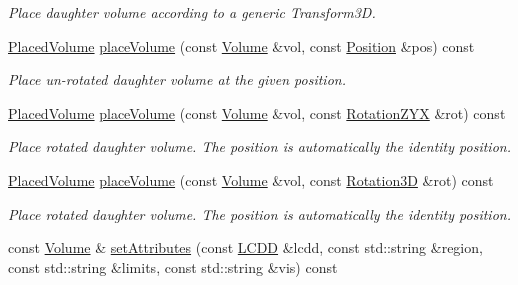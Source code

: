 \begin{DoxyCompactItemize}
\begin{DoxyCompactList}\small\item\em Place daughter volume according to a generic Transform3D. \item\end{DoxyCompactList}\item 
\hyperlink{class_d_d4hep_1_1_geometry_1_1_placed_volume}{PlacedVolume} \hyperlink{class_d_d4hep_1_1_geometry_1_1_volume_aeee43002378b1a0332d6b0ccdf4969b9}{placeVolume} (const \hyperlink{class_d_d4hep_1_1_geometry_1_1_volume}{Volume} \&vol, const \hyperlink{namespace_d_d4hep_1_1_geometry_a55083902099d03506c6db01b80404900}{Position} \&pos) const 
\begin{DoxyCompactList}\small\item\em Place un-\/rotated daughter volume at the given position. \item\end{DoxyCompactList}\item 
\hyperlink{class_d_d4hep_1_1_geometry_1_1_placed_volume}{PlacedVolume} \hyperlink{class_d_d4hep_1_1_geometry_1_1_volume_a26ca4b9a6bebdb8d6f8245ac64296f28}{placeVolume} (const \hyperlink{class_d_d4hep_1_1_geometry_1_1_volume}{Volume} \&vol, const \hyperlink{namespace_d_d4hep_1_1_geometry_a24667b2b9c3cec3d5239828db4d52189}{RotationZYX} \&rot) const 
\begin{DoxyCompactList}\small\item\em Place rotated daughter volume. The position is automatically the identity position. \item\end{DoxyCompactList}\item 
\hyperlink{class_d_d4hep_1_1_geometry_1_1_placed_volume}{PlacedVolume} \hyperlink{class_d_d4hep_1_1_geometry_1_1_volume_a5087814789bfdbf06b46b2569191a9c6}{placeVolume} (const \hyperlink{class_d_d4hep_1_1_geometry_1_1_volume}{Volume} \&vol, const \hyperlink{namespace_d_d4hep_1_1_geometry_a022fecb763315fa2bf39cbb648944a0e}{Rotation3D} \&rot) const 
\begin{DoxyCompactList}\small\item\em Place rotated daughter volume. The position is automatically the identity position. \item\end{DoxyCompactList}\item 
const \hyperlink{class_d_d4hep_1_1_geometry_1_1_volume}{Volume} \& \hyperlink{class_d_d4hep_1_1_geometry_1_1_volume_add08120b9db1393b5db41b5cf2cd3e01}{setAttributes} (const \hyperlink{class_d_d4hep_1_1_geometry_1_1_l_c_d_d}{LCDD} \&lcdd, const std::string \&region, const std::string \&limits, const std::string \&vis) const 

\end{DoxyCompactItemize}
